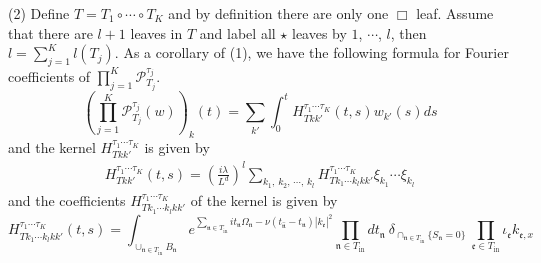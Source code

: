 \begin{lem}
(2) Define $T=T_1\circ \cdots \circ T_{K}$ and by definition there are only one $\Box$ leaf. Assume that there are $l+1$ leaves in $T$ and label all $\star$ leaves by $1$, $\cdots$, $l$, then $l=\sum_{j=1}^K l(T_j)$. As a corollary of (1), we have the following formula for Fourier coefficients of $\prod_{j=1}^K\mathcal{P}^{\tau_j}_{T_j}$.
\begin{equation}
    \left(\prod_{j=1}^K\mathcal{P}^{\tau_j}_{T_j}(w)\right)_{k}(t)=\sum_{k'}\int_0^t H^{\tau_1\cdots \tau_{K}}_{Tkk'}(t,s) w_{k'}(s) ds
\end{equation}
and the kernel $H^{\tau_1\cdots \tau_{K}}_{Tkk'}$ is given by
\begin{equation}
\begin{split}
H^{\tau_1\cdots \tau_{K}}_{Tkk'}(t,s)=\left(\frac{i\lambda}{L^{d}}\right)^l\sum_{k_1,\, k_2,\, \cdots,\, k_{l}} H^{\tau_1\cdots \tau_{K}}_{Tk_1\cdots k_{l}kk'} \xi_{k_1}\cdots \xi_{k_{l}}
\end{split}
\end{equation}
and the coefficients $H^{\tau_1\cdots \tau_{K}}_{Tk_1\cdots k_{l}kk'}$ of the kernel is given by 
\begin{equation}
H^{\tau_1\cdots \tau_{K}}_{Tk_1\cdots k_{l}kk'}(t,s)=\int_{\cup_{\mathfrak{n}\in T_{\text{in}}} B_{\mathfrak{n}}} e^{\sum_{\mathfrak{n}\in T_{\text{in}}} it_{\mathfrak{n}}\Omega_{\mathfrak{n}}-\nu(t_{\widehat{\mathfrak{n}}}-t_{\mathfrak{n}})|k_{\mathfrak{e}}|^2}  %
\prod_{\mathfrak{n}\in T_{\text{in}}} dt_{\mathfrak{n}} 
\ \delta_{\cap_{\mathfrak{n}\in T_{\text{in}}} \{S_{\mathfrak{n}}=0\}}\ \prod_{\mathfrak{e}\in T_{\text{in}}}\iota_{\mathfrak{e}}k_{\mathfrak{e},x}

\end{equation}
\end{lem}
